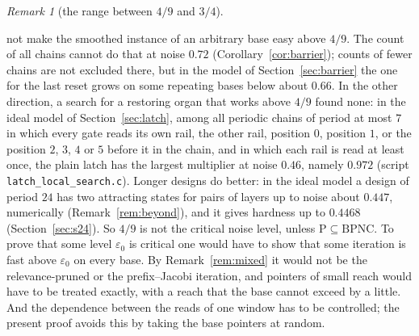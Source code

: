 \documentclass[11pt]{amsart}
\theoremstyle{definition}
\theoremstyle{remark}
\newtheorem{remark}[theorem]{Remark}
\newcommand{\eps}{\varepsilon}
\begin{document}
\begin{remark}[the range between $4/9$ and $3/4$]
\begin{enumerate}[label=(\roman*),leftmargin=2.4em]
not make the smoothed instance of an arbitrary base easy above $4/9$. The count of all chains
cannot do that at noise $0.72$ (Corollary~\ref{cor:barrier}); counts of fewer chains are not
excluded there, but in the model of Section~\ref{sec:barrier} the one for the last reset grows on
some repeating bases below about $0.66$. In the other direction, a search for a restoring
organ that works above $4/9$ found none: in the ideal model of Section~\ref{sec:latch}, among
all periodic chains of period at most $7$ in which every gate reads its own rail, the other rail,
position $0$, position $1$, or the position $2$, $3$, $4$ or $5$ before it in the chain, and in
which each rail is read at least once, the plain latch has the largest multiplier at noise
$0.46$, namely $0.972$ (script \texttt{latch\_local\_search.c}). Longer designs do better: in the
ideal model a design of period $24$ has two attracting states for pairs of layers up to noise
about $0.447$, numerically (Remark~\ref{rem:beyond}), and it gives hardness up to $0.4468$
(Section~\ref{sec:s24}). So $4/9$ is not the critical noise level, unless
$\mathrm P\subseteq\mathrm{BPNC}$.
To prove that some level $\eps_0$ is critical one would have to show that some iteration is fast
above $\eps_0$ on every base. By Remark~\ref{rem:mixed} it would not be the relevance-pruned
or the prefix--Jacobi iteration, and pointers of small reach would have to be treated exactly,
with a reach that the base cannot exceed by a little.
And the dependence between the reads of one window has to be controlled; the present proof
avoids this by taking the base pointers at random.
\end{enumerate}
\end{remark}
\end{document}
